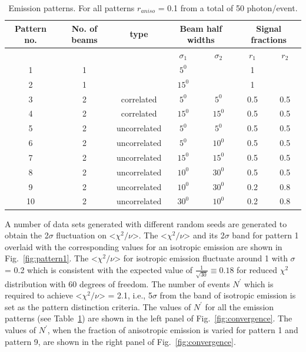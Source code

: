\begin{table}[h]
  \centering
  \caption{Emission patterns. For all patterns $r_{aniso}$ = 0.1 from a 
  total of 50 photon/event.}
  \label{tab:AnisoPattern}
  \begin{tabular}{|c |c |c|cc|cc|}
  \hline
  Pattern no. & No. of beams & type & \multicolumn{2}{c|}{Beam half widths}& \multicolumn{2}{c|}{Signal fractions} \\
  \hline
  &              &      &  $\sigma_1$ & $\sigma_2$   &  $r_1$ & $r_2$    \\
  \hline
  1 & 1 & & $5^{0}$ & & 1 & \\
   2 & 1 & & $15^{0}$ & & 1 & \\
   3 & 2 & correlated & $5^{0}$ & $5^{0}$ & 0.5 & 0.5  \\
   4 & 2 & correlated & $15^{0}$ & $15^{0}$ & 0.5 & 0.5 \\
   5 & 2 & uncorrelated & $5^{0}$ & $5^{0}$ & 0.5 & 0.5 \\
   6 & 2 & uncorrelated & $5^{0}$ & $10^{0}$ & 0.5 & 0.5 \\
   7 & 2 & uncorrelated & $15^{0}$ & $15^{0}$ & 0.5 & 0.5 \\
   8 & 2 & uncorrelated & $10^{0}$ & $30^{0}$ & 0.5 & 0.5 \\
   9 & 2 & uncorrelated & $10^{0}$ & $30^{0}$ & 0.2 & 0.8 \\
    10 & 2 & uncorrelated & $30^{0}$ & $10^{0}$ & 0.2 & 0.8 \\
  \hline
 \end{tabular}
\end{table}

A number of data sets generated with different random seeds are 
generated to obtain the 2$\sigma$ fluctuation on <$\chi^2/\nu$>. The <$\chi^2/\nu$> 
and its 2$\sigma$ band for pattern 1 overlaid with the corresponding values 
for an isotropic emission are shown in Fig.~\ref{fig:pattern1}. The <$\chi^2/\nu$> for 
isotropic emission fluctuate around 1 with $\sigma$ = 0.2 which is consistent with 
the expected value of $\frac{1}{\sqrt{30}} \equiv 0.18$ for reduced $\chi^2$ distribution 
with 60 degrees of freedom. The number of events 
$N^{'}$ which is required to achieve <$\chi^2/\nu$> = 2.1, i.e., 5$\sigma$ from the 
band of isotropic emission is set as the pattern distinction criteria. The values of 
$N^{'}$ for all the emission patterns (see Table~\ref{tab:AnisoPattern}) are shown 
in the left panel of Fig.~\ref{fig:convergence}. The values of $N^{'}$, when the fraction of anisotropic 
emission is varied for pattern 1 and pattern 9, are shown in the right panel of Fig.~\ref{fig:convergence}. 

